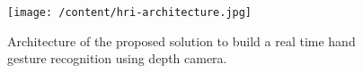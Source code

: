 \begin{figure}
	[h]
	\centering
	\texttt{[image: /content/hri-architecture.jpg]} \caption{Architecture of the proposed solution to build a real time hand gesture recognition using depth camera. } \label{fg:hri:architecture} 
\end{figure}
